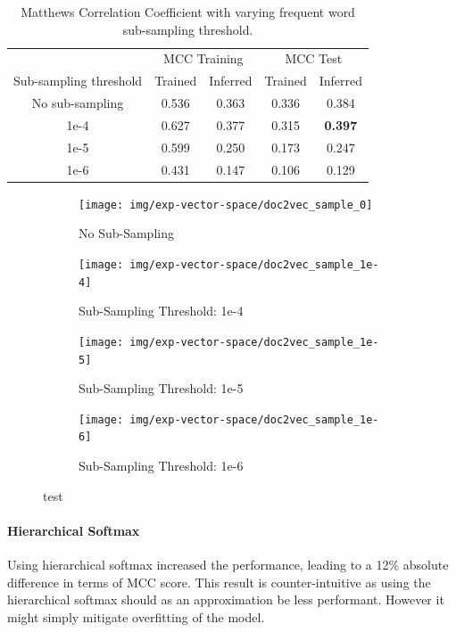 \begin{table}[h]
  \begin{center}
    \begin{tabular}{ c | *2c | *2c }
      \toprule
       & \multicolumn{2}{c|}{MCC Training} & \multicolumn{2}{|c}{MCC Test}\\
      Sub-sampling threshold & Trained & Inferred & Trained & Inferred \\
      \midrule
      No sub-sampling & 0.536 & 0.363 & 0.336 & 0.384 \\
      1e-4 & 0.627 & 0.377 & 0.315 & \textbf{0.397} \\
      1e-5 & 0.599 & 0.250 & 0.173 & 0.247 \\
      1e-6 & 0.431 & 0.147 & 0.106 & 0.129 \\
    \bottomrule
  \end{tabular}
  \caption{Matthews Correlation Coefficient with varying frequent word sub-sampling threshold.}
\label{tab:Paragraph Vector Parameter Results Sample}
\end{center}
\end{table}

\begin{figure}[h!]
    \centering
    \begin{subfigure}[b]{0.49\textwidth}
      \texttt{[image: img/exp-vector-space/doc2vec\_sample\_0]}
      \caption{No Sub-Sampling}
\label{fig:doc2vec_sample_0}
    \end{subfigure}
    \begin{subfigure}[b]{0.49\textwidth}
      \texttt{[image: img/exp-vector-space/doc2vec\_sample\_1e-4]}
    \caption{Sub-Sampling Threshold: 1e-4}
\label{fig:doc2vec_vector_size_1e-4}
    \end{subfigure}
    \begin{subfigure}[b]{0.49\textwidth}
      \texttt{[image: img/exp-vector-space/doc2vec\_sample\_1e-5]}
      \caption{Sub-Sampling Threshold: 1e-5}
\label{fig:doc2vec_vector_size_1e-5}
  \end{subfigure}
  \begin{subfigure}[b]{0.49\textwidth}
    \texttt{[image: img/exp-vector-space/doc2vec\_sample\_1e-6]}
    \caption{Sub-Sampling Threshold: 1e-6}
\label{fig:doc2vec_sample_1e-6}
  \end{subfigure}
\caption{test}
\label{fig:doc2vec_sample}
\end{figure}

\paragraph{Hierarchical Softmax}
Using hierarchical softmax increased the performance, leading to a 12\% absolute difference in terms of MCC score. This result is counter-intuitive as using the hierarchical softmax should as an approximation be less performant. However it might simply mitigate overfitting of the model.

